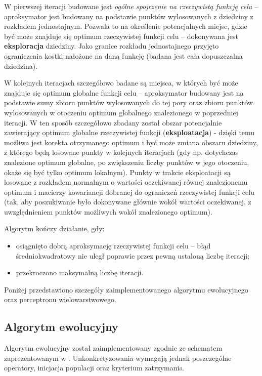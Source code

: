 \documentclass[runningheads]{llncs}
\begin{document}
W pierwszej iteracji budowane jest \emph{ogólne spojrzenie na rzeczywistą 
funkcję celu} -- aproksymator jest budowany na podstawie punktów wylosowanych z 
dziedziny z rozkładem jednostajnym. Pozwala to 
na określenie potencjalnych miejsc, gdzie być może znajduje się optimum 
rzeczywistej funkcji celu -- dokonywana jest \textbf{eksploracja} dziedziny. 
Jako granice rozkładu jednostajnego przyjęto ograniczenia kostki 
nałożone na daną funkcję (badana jest cała dopuszczalna dziedzina).

W kolejnych iteracjach szczegółowo badane są miejsca, w których być może 
znajduje się optimum globalne funkcji celu -- aproksymator budowany jest na 
podstawie sumy zbioru punktów wylosowanych do tej pory oraz zbioru punktów 
wylosowanych w otoczeniu optimum globalnego znalezionego w poprzedniej 
iteracji. W ten sposób szczegółowo zbadany został obszar potencjalnie 
zawierający optimum globalne rzeczywistej funkcji (\textbf{eksploatacja}) - 
dzięki temu możliwa jest korekta otrzymanego optimum i być może zmiana 
obszaru dziedziny, z którego będą losowane punkty w kolejnych iteracjach (gdy 
np. dotychczas znalezione optimum globalne, po zwiększeniu liczby punktów w 
jego otoczeniu, okaże się być tylko optimum lokalnym). Punkty w trakcie 
eksploatacji są losowane z rozkładem normalnym o wartości oczekiwanej równej 
znalezionemu optimum i macierzy kowariancji dobranej do ograniczeń rzeczywistej 
funkcji celu (tak, aby poszukiwanie było dokonywane głównie wokół wartości 
oczekiwanej, z uwzględnieniem punktów możliwych wokół znalezionego optimum).

Algorytm kończy działanie, gdy:
\begin{itemize}
 \item osiągnięto dobrą aproksymację rzeczywistej funkcji celu -- błąd 
średniokwadratowy nie uległ poprawie przez pewną ustaloną liczbę iteracji;
 \item przekroczono maksymalną liczbę iteracji.
\end{itemize}

Poniżej przedstawiono szczegóły zaimplementowanego algorytmu ewolucyjnego oraz 
perceptronu wielowarstwowego.

\subsection{Algorytm ewolucyjny}

Algorytm ewolucyjny został zaimplementowany zgodnie ze schematem 
zaprezentowanym w \cite{arabas}. Unkonkretyzowania 
wymagają jednak poszczególne operatory, inicjacja populacji oraz kryterium 
zatrzymania. 
\end{document}
